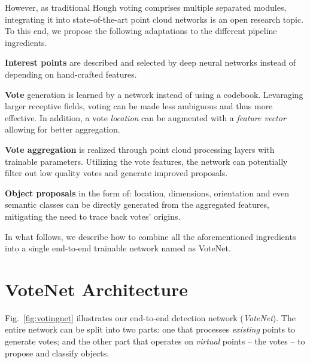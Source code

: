 \documentclass[10pt,twocolumn,letterpaper]{article}
\newcommand\votenet{VoteNet}
\begin{document}
However, as traditional Hough voting comprises multiple separated modules, integrating it into state-of-the-art point cloud networks is an open research topic. To this end, we propose the following adaptations to the different pipeline ingredients.
\smallskip











\noindent \textbf{Interest points}
are described and selected by deep neural networks instead of depending on hand-crafted features.

\smallskip


\noindent\textbf{Vote} generation is learned by a network instead of using a codebook. Levaraging larger receptive fields, voting can be made less ambiguous and thus more effective. In addition, a vote \emph{location} can be augmented with a \emph{feature vector} allowing for better aggregation. 



\smallskip
\noindent\textbf{Vote aggregation} is realized through point cloud processing layers with trainable parameters. Utilizing the vote features, the network can potentially filter out low quality votes and generate improved proposals.



\smallskip
\noindent\textbf{Object proposals} in the form of: location, dimensions, orientation and even semantic classes can be directly generated from the aggregated features, mitigating the need to trace back votes' origins.




In what follows, we describe how to combine all the aforementioned ingredients into a single end-to-end trainable network named as \votenet{}.




%
 
\section{VoteNet Architecture}


Fig.~\ref{fig:votingnet} illustrates our end-to-end detection network (\emph{\votenet{}}).
The entire network can be split into two parts: one that processes \emph{existing} points to generate votes; and the other part that operates on \emph{virtual} points -- the votes -- to propose and classify objects.
\end{document}
